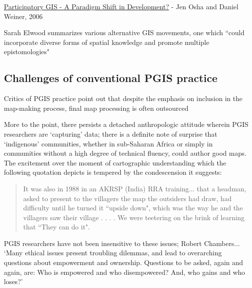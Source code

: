 \documentclass[11pt,oneside,notitlepage]{report}
\begin{document}

\href{http://www.directionsmag.com/article.php?article_id=2365&trv=1.}{Participatory GIS - A Paradigm Shift in Development?} - Jen Osha and Daniel Weiner, 2006

Sarah Elwood summarizes various alternative GIS movements, one which ``could incorporate diverse forms of spatial knowledge and promote multiple epistomologies" \cite{elwood2009representations}

\subsection{Challenges of conventional PGIS practice}
\label{subsec:pgisshortcomings}

Critics of PGIS practice point out that despite the emphasis on inclusion in the map-making process, final map processing is often outsourced

More to the point, there persists a detached anthropologic attitude wherein PGIS researchers are `capturing' data; there is a definite note of surprise that `indigenous' communities, whether in sub-Saharan Africa or simply in communities without a high degree of technical fluency, could author good maps. The excitement over the moment of cartographic understanding which the following quotation depicts is tempered by the condescension it suggests: 

\begin{quote}
It was also in 1988 in an AKRSP (India) RRA training... that a headman, asked to present to the villagers the map the outsiders had draw, had difficulty until he turned it ``upside down", which was the way he and the villagers saw their village . . . . We were teetering on the brink of learning that ``They can do it".
\cite{chambers2006participatory}
\end{quote}

PGIS researchers have not been insensitive to these issues; Robert Chambers...  `Many ethical issues present troubling dilemmas, and lead to overarching questions about empowerment and ownership. Questions to be asked, again and again, are: Who is empowered and who disempowered? And, who gains and who loses?' \cite{chambers2006whose}
\end{document}
